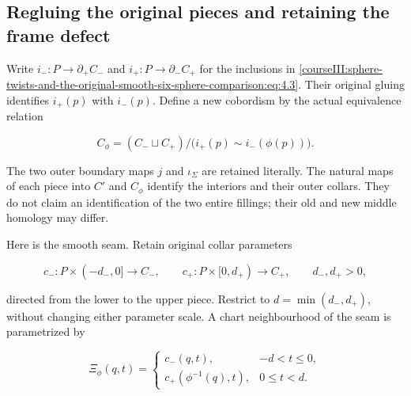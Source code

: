 \subsection{Regluing the original pieces and retaining the frame defect}
\label{courseIII:sphere-twists-and-the-original-smooth-six-sphere-comparison:twist-original-gluing}

\label{courseIII:sphere-twists-and-the-original-smooth-six-sphere-comparison:section-5}

Write \(i_-:P\to\partial_+C_-\) and \(i_+:P\to\partial_-C_+\) for the inclusions in \eqref{courseIII:sphere-twists-and-the-original-smooth-six-sphere-comparison:eq:4.3}. Their original gluing identifies \(i_+(p)\) with \(i_-(p)\). Define a new cobordism by the actual equivalence relation

\begin{equation}
C_\phi=(C_-\sqcup C_+)/\bigl(i_+(p)\sim i_-(\phi(p))\bigr).
 \label{courseIII:sphere-twists-and-the-original-smooth-six-sphere-comparison:eq:5.1}
\end{equation}

The two outer boundary maps \(j\) and \(\iota_\Sigma\) are retained literally. The natural maps of each piece into \(C'\) and \(C_\phi\) identify the interiors and their outer collars. They do not claim an identification of the two entire fillings; their old and new middle homology may differ.

Here is the smooth seam. Retain original collar parameters

\begin{equation}
c_-:P\times(-d_-,0]\to C_-,\qquad
 c_+:P\times[0,d_+)\to C_+,
 \qquad d_-,d_+>0,
 \label{courseIII:sphere-twists-and-the-original-smooth-six-sphere-comparison:eq:5.2}
\end{equation}

directed from the lower to the upper piece. Restrict to \(d=\min(d_-,d_+)\), without changing either parameter scale. A chart neighbourhood of the seam is parametrized by

\begin{equation}
\Xi_\phi(q,t)=
 \begin{cases}
    c_-(q,t),&-d<t\le0,\\
    c_+(\phi^{-1}(q),t),&0\le t<d .
 \end{cases}
 \label{courseIII:sphere-twists-and-the-original-smooth-six-sphere-comparison:eq:5.3}
\end{equation}

